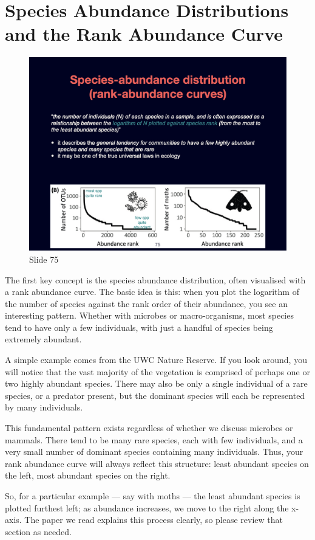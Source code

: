 \documentclass[
  10pt,
]{book}
\begin{document}
\section{Species Abundance Distributions and the Rank Abundance
Curve}\label{species-abundance-distributions-and-the-rank-abundance-curve}

\begin{figure}[ht]
\centering
\includegraphics[width=0.8\linewidth]{../images/BDC334/BDC334-075.jpeg}
\caption*{Slide 75}
\end{figure}

The first key concept is the species abundance distribution, often
visualised with a rank abundance curve. The basic idea is this: when you
plot the logarithm of the number of species against the rank order of
their abundance, you see an interesting pattern. Whether with microbes
or macro-organisms, most species tend to have only a few individuals,
with just a handful of species being extremely abundant.

A simple example comes from the UWC Nature Reserve. If you look around,
you will notice that the vast majority of the vegetation is comprised of
perhaps one or two highly abundant species. There may also be only a
single individual of a rare species, or a predator present, but the
dominant species will each be represented by many individuals.

This fundamental pattern exists regardless of whether we discuss
microbes or mammals. There tend to be many rare species, each with few
individuals, and a very small number of dominant species containing many
individuals. Thus, your rank abundance curve will always reflect this
structure: least abundant species on the left, most abundant species on
the right.

So, for a particular example --- say with moths --- the least abundant
species is plotted furthest left; as abundance increases, we move to the
right along the x-axis. The paper we read explains this process clearly,
so please review that section as needed.
\end{document}
